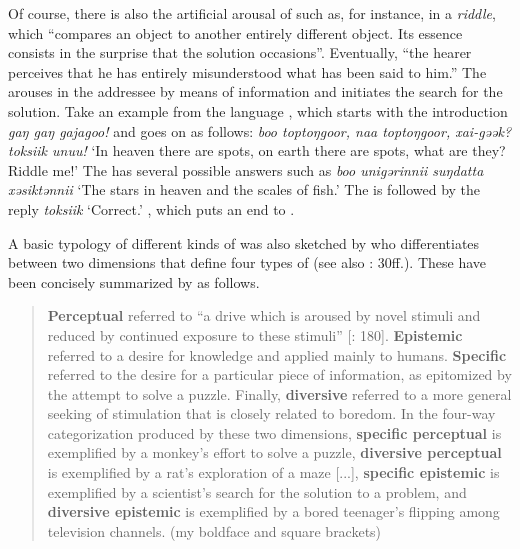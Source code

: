 Of course, there is also the artificial arousal of  such as, for instance, in a \textit{riddle}, which “compares an object to another entirely different object. Its essence consists in the surprise that the solution occasions”. Eventually, “the hearer perceives that he has entirely misunderstood what has been said to him.” \citep[129]{Taylor1943} The  arouses  in the addressee by means of  information and initiates the search for the solution. Take an example from the  language , which starts with the introduction \textit{gaŋ gaŋ gajagoo!} and goes on as follows: \textit{boo toptoŋgoor, naa toptoŋgoor, xai-gəək? toksiik unuu!} ‘In heaven there are spots, on earth there are spots, what are they? Riddle me!’ The  has several possible answers such as \textit{boo unigərinnii suŋdatta xəsiktənnii} ‘The stars in heaven and the scales of fish.’ The  is followed by the reply \textit{toksiik} ‘Correct.’ \citep[93]{Ikegami1958}, which puts an end to .

A basic typology of different kinds of  was also sketched by \citet{Berlyne1954} who differentiates between two dimensions that define four types of  (see also \citealt{Dewey1910}: 30ff.). These have been concisely summarized by \citet[77]{Loewenstein1994} as follows.

\begin{quote}
\textbf{Perceptual}  referred to “a drive which is aroused by novel stimuli and reduced by continued exposure to these stimuli” [\citealt{Berlyne1954}: 180]. \textbf{Epistemic}  referred to a desire for knowledge and applied mainly to humans. \textbf{Specific}  referred to the desire for a particular piece of information, as epitomized by the attempt to solve a puzzle. Finally, \textbf{diversive}  referred to a more general seeking of stimulation that is closely related to boredom. In the four-way categorization produced by these two dimensions, \textbf{specific perceptual}  is exemplified by a monkey’s effort to solve a puzzle, \textbf{diversive perceptual}  is exemplified by a rat’s exploration of a maze [...], \textbf{specific epistemic}  is exemplified by a scientist’s search for the solution to a problem, and \textbf{diversive epistemic}  is exemplified by a bored teenager’s flipping among television channels. (my boldface and square brackets)
\end{quote}


